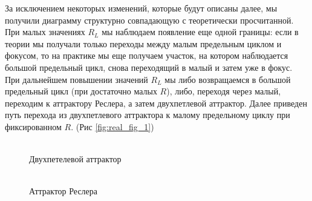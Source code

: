 \documentclass[12pt]{article}
\begin{document}
За исключением некоторых изменений, которые будут описаны далее, мы получили диаграмму структурно совпадающую с теоретически просчитанной.
При малых значениях $R_L$ мы наблюдаем появление еще одной границы: если в теории мы получали только переходы между малым предельным циклом и фокусом, то на практике мы еще получаем участок, на котором наблюдается большой предельный цикл, снова переходящий в малый и затем уже в фокус.
При дальнейшем повышении значений $R_L$ мы либо возвращаемся в большой предельный цикл (при достаточно малых $R$), либо, переходя через малый, переходим к аттрактору Реслера, а затем двухпетлевой аттрактор.
Далее приведен путь перехода из двухпетлевого аттрактора к малому предельному циклу при фиксированном $R$. (Рис \ref{fig:real_fig_1})
\begin{figure}[H]
	\begin{minipage}[h]{0.47\linewidth}
		  \\ Двухпетелевой аттрактор
	\end{minipage}
	\hfill
	\begin{minipage}[h]{0.47\linewidth}
		 \\ Аттрактор Реслера

\end{minipage}
\end{figure}
\end{document}
